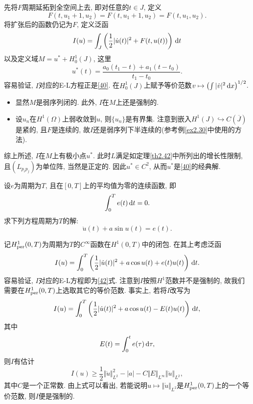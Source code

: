 先将$F$周期延拓到全空间上去, 即对任意的$t \in J$, 定义 
\begin{equation*}
    F(t, u_1 + 1, u_2) = F(t, u_1 + 1, u_2) = F(t, u_1, u_2).
\end{equation*}
将扩张后的函数仍记为$F$, 定义泛函 
\begin{equation*}
    I(u) = \int_J\left(\frac{1}{2}|\dot u(t)|^2 + F(t, u(t))\right) \,{\rm d}t
\end{equation*}
以及定义域$M = u^* + H_0^1(J)$, 这里 
\begin{equation*}
    u^*(t) = \frac{a_0(t_1 - t) + a_1(t - t_0)}{t_1 - t_0}.
\end{equation*}
容易验证, $I$对应的E-L方程正是\eqref{40}. 在$H_0^1(J)$上赋予等价范数$v \mapsto \left(\int|\dot v|^2 \,{\rm d}x\right)^{1/2}$.
\begin{itemize}
    \item 显然$M$是弱序列闭的. 此外, $I$在$M$上还是强制的.
    \item 设$u_n$在$H^1(\Omega)$上弱收敛到$u$, 则$\{u_n\}$是有界集.
    注意到嵌入$H^1(J) \hookrightarrow C(\overline{J})$是紧的, 且$F$是连续的, 故$I$还是弱序列下半连续的(参考例\ref{ex2.30}中使用的方法). 
\end{itemize}
综上所述, $I$在$M$上有极小点$u^*$. 此时$L$满足如定理\ref{th2.42}中所列出的增长性限制, 且$(L_{p_ip_j})$为单位阵, 当然是正定的.
因此$u^* \in C^2$, 从而$u^*$是\eqref{40}的经典解.

\begin{example}[强迫振动的周期解]
    设$e$为周期为$T$, 且在$[0, T]$上的平均值为零的连续函数, 即 
    \begin{equation}\label{41}
        \int_0^Te(t) \,{\rm d}t = 0.
    \end{equation}
    求下列方程周期为$T$的解:
    \begin{equation*}
        \ddot u(t) + a\sin u(t) = e(t).
    \end{equation*}
\end{example}

记$H_{{\rm per}}^1(0, T)$为周期为$T$的$C^{\infty}$函数在$H^1(0, T)$中的闭包.
在其上考虑泛函 
\begin{equation*}
    I(u) = \int_0^T\left(\frac{1}{2}|\dot u(t)|^2 + a\cos u(t) + e(t)u(t)\right) \,{\rm d}t.
\end{equation*}
容易验证, $I$对应的E-L方程即为\eqref{42}式. 注意到$I$按照$H^1$范数并不是强制的, 故我们需要在$H_{{\rm per}}^1(0, T)$上选取其它的等价范数.
事实上, 若将$I$改写为
\begin{equation*}
    I(u) = \int_0^T\left(\frac{1}{2}|\dot u(t)|^2 + a\cos u(t) - E(t)u(t)\right) \,{\rm d}t,
\end{equation*}
其中 
\begin{equation*}
    E(t) = \int_0^te(\tau) \,{\rm d}\tau,
\end{equation*}
则$I$有估计 
\begin{equation*}
    I(u) \geq \frac{1}{2}\Vert \dot u \Vert_{L^2}^2 - |a| - C\Vert E \Vert_{L^{\infty}}\Vert \dot u \Vert_{L^2},
\end{equation*}
其中$C$是一个正常数. 由上式可以看出, 若能说明$u \mapsto \Vert \dot u \Vert_{L^2}$是$H_{{\rm per}}^1(0, T)$上的一个等价范数, 则$I$便是强制的.


